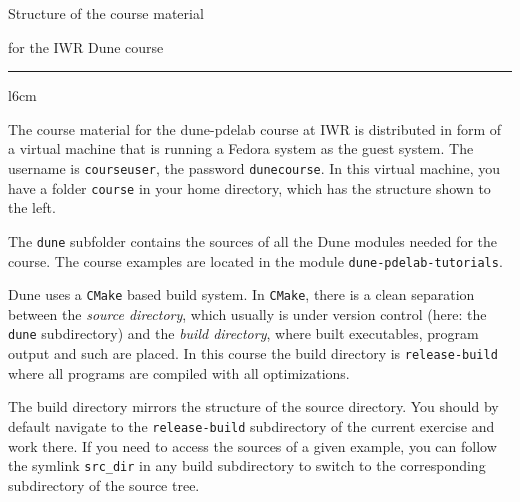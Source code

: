 \documentclass{article}
\begin{document}
\par\bigskip
  \begin{center}
    \large{Structure of the course material} \par
    for the IWR Dune course
  \end{center}
  \rule{\textwidth}{1pt}
  \bigskip

\begin{wrapfigure}{l}{6cm}
\end{wrapfigure}

The course material for the dune-pdelab course at IWR is distributed in form of
a virtual machine that is running a Fedora system as the guest system. The
username is \verb!courseuser!, the password \verb!dunecourse!. In this virtual
machine, you have a folder \verb!course! in your home directory, which has the
structure shown to the left.

The \verb!dune! subfolder contains the sources of all the Dune modules
needed for the course. The course examples are located in the module
\verb!dune-pdelab-tutorials!.

Dune uses a \verb!CMake! based build system. In \verb!CMake!, there is
a clean separation between the \textit{source directory}, which
usually is under version control (here: the \verb!dune! subdirectory)
and the \textit{build directory}, where built executables, program
output and such are placed. In this course the build directory is
\verb!release-build! where all programs are compiled with all optimizations.

The build directory mirrors the structure of the source
directory. You should by default navigate to the \verb!release-build!
subdirectory of the current exercise and work there. If you need to
access the sources of a given example, you can follow the symlink
\verb!src_dir! in any build subdirectory to switch to the
corresponding subdirectory of the source tree.
\end{document}
